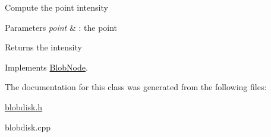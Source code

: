 Compute the point intensity


\begin{DoxyParams}{Parameters}
{\em point} & : the point \\
\hline
\end{DoxyParams}
\begin{DoxyReturn}{Returns}
the intensity 
\end{DoxyReturn}


Implements \hyperlink{class_blob_node_a4987f9060e9141647c514efd9859d0ba}{BlobNode}.



The documentation for this class was generated from the following files:\begin{DoxyCompactItemize}
\item 
\hyperlink{blobdisk_8h}{blobdisk.h}\item 
blobdisk.cpp\end{DoxyCompactItemize}
